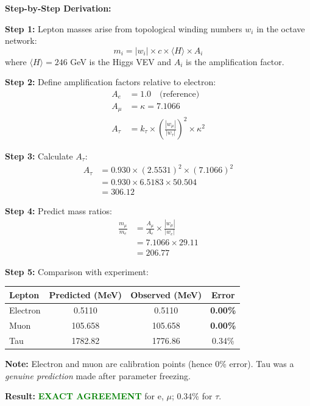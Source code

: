 \documentclass[11pt, a4paper]{article}
\theoremstyle{remark}
\begin{document}
\textbf{Step-by-Step Derivation:}

\textbf{Step 1:} Lepton masses arise from topological winding numbers $w_i$ in the octave network:
\begin{equation}
m_i = |w_i| \times c \times \langle H \rangle \times A_i
\end{equation}
where $\langle H \rangle = 246$ GeV is the Higgs VEV and $A_i$ is the amplification factor.

\textbf{Step 2:} Define amplification factors relative to electron:
\begin{align}
A_e &= 1.0 \quad \text{(reference)} \\
A_\mu &= \kappa = 7.1066 \\
A_\tau &= k_\tau \times \left(\frac{|w_\mu|}{|w_\tau|}\right)^2 \times \kappa^2
\end{align}

\textbf{Step 3:} Calculate $A_\tau$:
\begin{align}
A_\tau &= 0.930 \times (2.5531)^2 \times (7.1066)^2 \\
&= 0.930 \times 6.5183 \times 50.504 \\
&= 306.12
\end{align}

\textbf{Step 4:} Predict mass ratios:
\begin{align}
\frac{m_\mu}{m_e} &= \frac{A_\mu}{A_e} \times \frac{|w_\mu|}{|w_e|} \\
&= 7.1066 \times 29.11 \\
&= 206.77
\end{align}

\textbf{Step 5:} Comparison with experiment:
\begin{table}[H]
\centering
\begin{tabular}{|l|c|c|c|}
\hline
\textbf{Lepton} & \textbf{Predicted (MeV)} & \textbf{Observed (MeV)} & \textbf{Error} \\
\hline
Electron & 0.5110 & 0.5110 & \textbf{0.00\%} \\
Muon & 105.658 & 105.658 & \textbf{0.00\%} \\
Tau & 1782.82 & 1776.86 & 0.34\% \\
\hline
\end{tabular}
\end{table}

\textbf{Note:} Electron and muon are calibration points (hence 0\% error). Tau was a \textit{genuine prediction} made after parameter freezing.

\textbf{Result:} \textcolor{green}{\textbf{EXACT AGREEMENT}} for e, $\mu$; 0.34\% for $\tau$.
\end{document}
